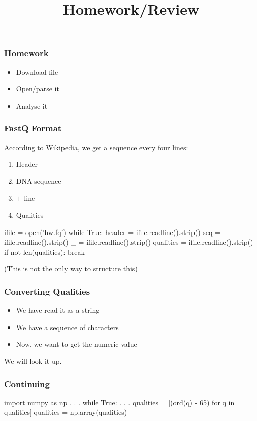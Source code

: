 
\title{Homework/Review}
\usepackage{pgfpages}


\frame{\maketitle}

\begin{frame}[fragile]
\frametitle{Homework}
\begin{itemize}
\item Download file
\item Open/parse it
\item Analyse it
\end{itemize}
\end{frame}

\begin{frame}[fragile]
\frametitle{FastQ Format}
According to Wikipedia, we get a sequence every four lines:

\begin{enumerate}
\item Header
\item DNA sequence
\item $+$ line
\item Qualities
\end{enumerate}

\begin{python}
ifile = open('hw.fq')
while True:
    header = ifile.readline().strip()
    seq = ifile.readline().strip()
    _ = ifile.readline().strip()
    qualities = ifile.readline().strip()
    if not len(qualities):
        break
\end{python}

(This is not the only way to structure this)
\end{frame}

\begin{frame}[fragile]
\frametitle{Converting Qualities}
\begin{itemize}
\item We have read it as a string
\item We have a sequence of characters
\item Now, we want to get the numeric value
\end{itemize}

We will look it up.
\end{frame}

\begin{frame}[fragile]
\frametitle{Continuing}

\begin{python}
import numpy as np
. . .
while True:
    . . .
    qualities = [(ord(q) - 65) for q in qualities]
    qualities = np.array(qualities)
\end{python}

\end{frame}



